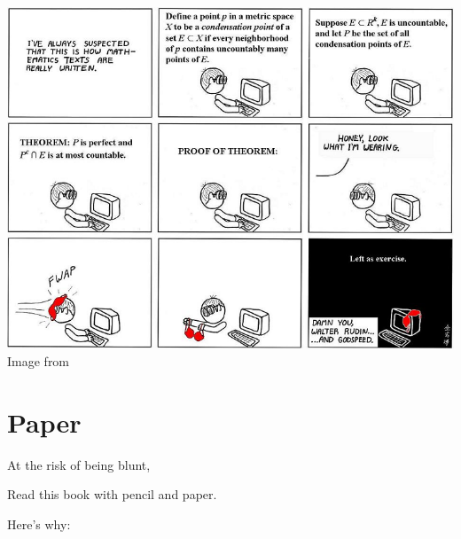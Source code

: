 \begin{center}
	\includegraphics[width=14cm]{media/abstruse-goose-exercise.png}
	\\ \scriptsize Image from \cite{img:exercise}
\end{center}


\section{Paper}
At the risk of being blunt,
\begin{moral}
Read this book with pencil and paper.
\end{moral}
Here's why:

